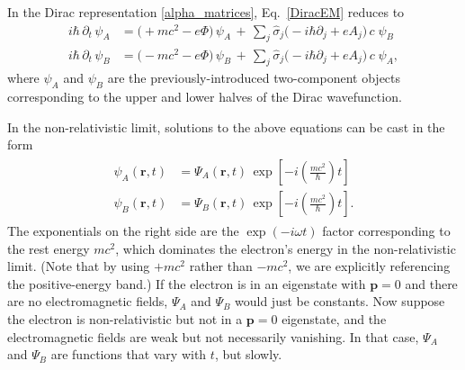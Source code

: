 \documentclass[pra,12pt]{revtex4}
\begin{document}
In the Dirac representation \eqref{alpha_matrices},
Eq.~\eqref{DiracEM} reduces to
\begin{align}
  i\hbar\, \partial_t \, \psi_A
  &= \big(+mc^2 -e\Phi \big)\,
  \psi_A
  \,+\, \sum_{j} \hat{\sigma}_j \big(-i\hbar\partial_j
    +eA_j \big) \,c\;\psi_B \label{Dirac2a} \\
  i\hbar\, \partial_t \, \psi_B
  &= \big(- mc^2 -e\Phi\big)\,
  \psi_B \,+\, \sum_{j} \hat{\sigma}_j \big(-i\hbar\partial_j
    +eA_j \big)\, c\;\psi_A, \label{Dirac2b}
\end{align}
where $\psi_A$ and $\psi_B$ are the previously-introduced
two-component objects corresponding to the upper and lower halves of
the Dirac wavefunction.

In the non-relativistic limit, solutions to the above equations can be
cast in the form
\begin{align}
  \begin{aligned}
  \psi_{A}(\mathbf{r},t) &= \Psi_{A}(\mathbf{r},t)\,
  \exp\left[-i\left(\frac{mc^2}{\hbar}\right)t\right] \\
  \psi_{B}(\mathbf{r},t) &= \Psi_{B}(\mathbf{r},t)\,
  \exp\left[-i\left(\frac{mc^2}{\hbar}\right)t\right].
  \end{aligned}
\end{align}
The exponentials on the right side are the $\exp(-i\omega t)$ factor
corresponding to the rest energy $mc^2$, which dominates the
electron's energy in the non-relativistic limit.  (Note that by using
$+mc^2$ rather than $-mc^2$, we are explicitly referencing the
positive-energy band.)  If the electron is in an eigenstate with
$\mathbf{p} = 0$ and there are no electromagnetic fields, $\Psi_A$ and
$\Psi_B$ would just be constants.  Now suppose the electron is
non-relativistic but not in a $\mathbf{p} = 0$ eigenstate, and the
electromagnetic fields are weak but not necessarily vanishing.  In
that case, $\Psi_A$ and $\Psi_B$ are functions that vary with $t$, but
slowly.
\end{document}
